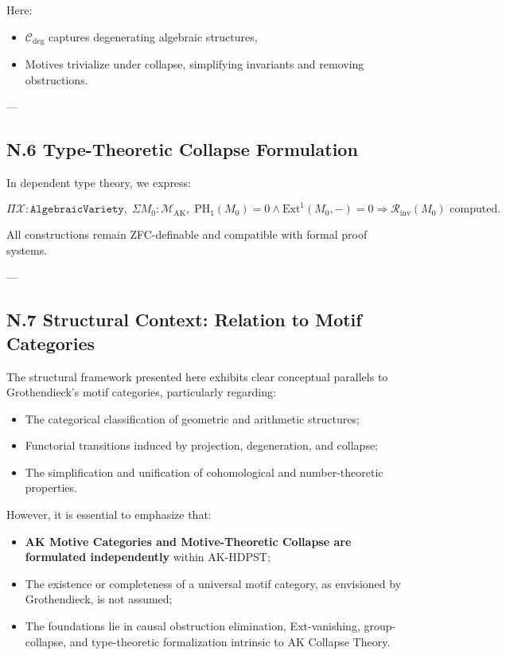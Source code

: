 \documentclass[11pt]{article}
\begin{document}
Here:
\begin{itemize}
  \item \( \mathcal{C}_{\mathrm{deg}} \) captures degenerating algebraic structures,
  \item Motives trivialize under collapse, simplifying invariants and removing obstructions.
\end{itemize}

---

\subsection*{N.6 Type-Theoretic Collapse Formulation}

In dependent type theory, we express:

\[
\Pi \mathcal{X} : \texttt{AlgebraicVariety}, \;
\Sigma M_0 : \mathcal{M}_{\mathrm{AK}}, \;
\mathrm{PH}_1(M_0) = 0 \wedge \mathrm{Ext}^1(M_0, -) = 0
\Rightarrow 
\mathcal{R}_{\mathrm{inv}}(M_0) \text{ computed}.
\]

All constructions remain ZFC-definable and compatible with formal proof systems.

---

\subsection*{N.7 Structural Context: Relation to Motif Categories}

The structural framework presented here exhibits clear conceptual parallels to Grothendieck's motif categories, particularly regarding:

\begin{itemize}
  \item The categorical classification of geometric and arithmetic structures;
  \item Functorial transitions induced by projection, degeneration, and collapse;
  \item The simplification and unification of cohomological and number-theoretic properties.
\end{itemize}

However, it is essential to emphasize that:

\begin{itemize}
  \item \textbf{AK Motive Categories and Motive-Theoretic Collapse are formulated independently} within AK-HDPST;
  \item The existence or completeness of a universal motif category, as envisioned by Grothendieck, is not assumed;
  \item The foundations lie in causal obstruction elimination, Ext-vanishing, group-collapse, and type-theoretic formalization intrinsic to AK Collapse Theory.
\end{itemize}
\end{document}
